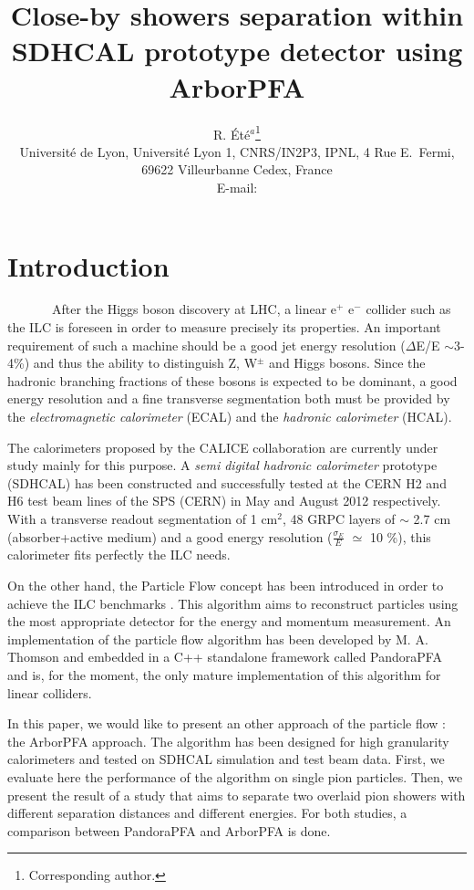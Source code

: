 \documentclass[cits]{JINST}
\title{Close-by showers separation within SDHCAL prototype detector using ArborPFA}
\author{R. \'Et\'e$^a$\thanks{Corresponding author.} \\%
\llap{$^a$} Universit\'e de Lyon, Universit\'e Lyon 1, CNRS/IN2P3, 
 IPNL, 4 Rue E.~Fermi, 69622 Villeurbanne Cedex, France\\
 
 
 E-mail: \email{rete@ipnl.in2p3.fr}
 }
\begin{document}

\section{Introduction}

~~~~~~~After the Higgs boson discovery at LHC, a linear e$^+$ e$^-$ collider such as the ILC is foreseen in order to measure precisely its properties. An important requirement of such a machine should be a good jet energy resolution ($\Delta$E/E $\sim$3-4\%) and thus the ability to distinguish Z, W$^{\pm}$ and Higgs bosons. Since the hadronic branching fractions of these bosons is expected to be dominant, a good energy resolution and a fine transverse segmentation both must be provided by the \textit{electromagnetic calorimeter} (ECAL) and the \textit{hadronic calorimeter} (HCAL).

The calorimeters proposed by the CALICE collaboration are currently under study mainly for this purpose. A \textit{semi digital hadronic calorimeter} prototype (SDHCAL) has been constructed \cite{sdhcal-paper} and successfully tested at the CERN H2 and H6 test beam lines of the SPS (CERN) in May and August 2012 respectively. With a transverse readout segmentation of 1 cm$^2$, 48 GRPC layers of $\sim$ 2.7 cm (absorber+active medium) and a good energy resolution ($\frac{\sigma_{E}}{E}$ $\simeq$ 10 \%), this calorimeter fits perfectly the ILC needs. 

On the other hand, the Particle Flow concept has been introduced in order to achieve the ILC benchmarks \cite{ilc-tdr}. This algorithm aims to reconstruct particles using the most appropriate detector for the energy and momentum measurement. An implementation of the particle flow algorithm has been developed by M. A. Thomson \cite{pandora-pfa} and embedded in a C++ standalone framework called PandoraPFA and is, for the moment, the only mature implementation of this algorithm for linear colliders.

In this paper, we would like to present an other approach of the particle flow : the ArborPFA approach. The algorithm has been designed for high granularity calorimeters and tested on SDHCAL simulation and test beam data. First, we evaluate here the performance of the algorithm on single pion particles. Then, we present the result of a study that aims to separate two overlaid pion showers with different separation distances and different energies. For both studies, a comparison between PandoraPFA and ArborPFA is done.
\end{document}
